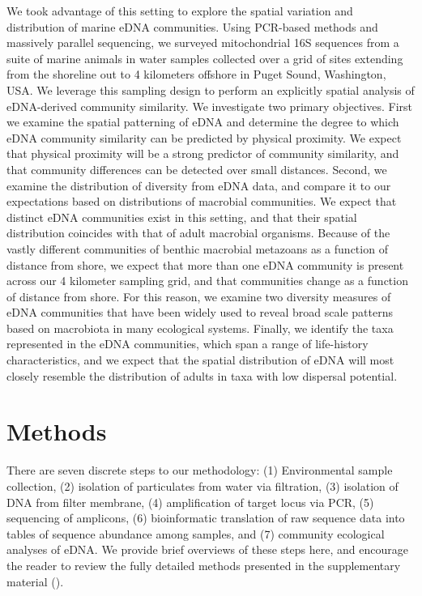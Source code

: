 \documentclass[11pt,letterpaper]{article} %
\begin{document}
We took advantage of this setting to explore the spatial variation and distribution of marine eDNA communities. Using PCR-based methods and massively parallel sequencing, we surveyed mitochondrial 16S sequences from a suite of marine animals in water samples collected over a grid of sites extending from the shoreline out to 4 kilometers offshore in Puget Sound, Washington, USA. We leverage this sampling design to perform an explicitly spatial analysis of eDNA-derived community similarity. We investigate two primary objectives. First we examine the spatial patterning of eDNA and determine the degree to which eDNA community similarity can be predicted by physical proximity. We expect that physical proximity will be a strong predictor of community similarity, and that community differences can be detected over small distances. Second, we examine the distribution of diversity from eDNA data, and compare it to our expectations based on distributions of macrobial communities. We expect that distinct eDNA communities exist in this setting, and that their spatial distribution coincides with that of adult macrobial organisms. Because of the vastly different communities of benthic macrobial metazoans as a function of distance from shore, we expect that more than one eDNA community is present across our 4 kilometer sampling grid, and that communities change as a function of distance from shore. For this reason, we examine two diversity measures of eDNA communities that have been widely used to reveal broad scale patterns based on macrobiota in many ecological systems. Finally, we identify the taxa represented in the eDNA communities, which span a range of life-history characteristics, and we expect that the spatial distribution of eDNA will most closely resemble the distribution of adults in taxa with low dispersal potential.


\section*{Methods}
There are seven discrete steps to our methodology: (1) Environmental sample collection, (2) isolation of particulates from water via filtration, (3) isolation of DNA from filter membrane, (4) amplification of target locus via PCR, (5) sequencing of amplicons, (6) bioinformatic translation of raw sequence data into tables of sequence abundance among samples, and (7) community ecological analyses of eDNA. We provide brief overviews of these steps here, and encourage the reader to review the fully detailed methods presented in the supplementary material ().
\end{document}
